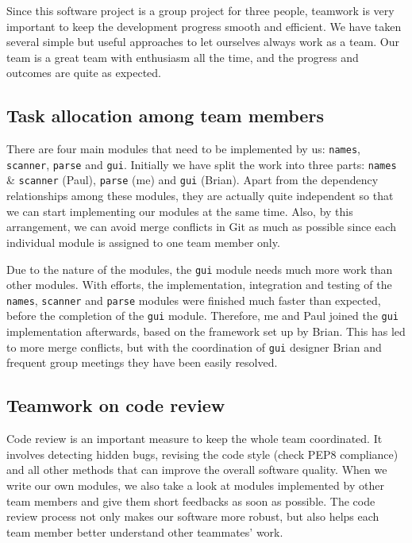 \documentclass[10pt,a4paper]{article}
\begin{document}
Since this software project is a group project for three people,
teamwork is very important to keep the development progress smooth and
efficient. We have taken several simple but useful approaches to let
ourselves always work as a team. Our team is a great team with
enthusiasm all the time, and the progress and outcomes are quite as
expected.

\subsection{Task allocation among team members}
\label{sec:org3615d9e}

There are four main modules that need to be implemented by us:
\texttt{names}, \texttt{scanner}, \texttt{parse} and \texttt{gui}. Initially we have split the
work into three parts: \texttt{names} \& \texttt{scanner} (Paul), \texttt{parse} (me) and
\texttt{gui} (Brian). Apart from the dependency relationships among these
modules, they are actually quite independent so that we can start
implementing our modules at the same time. Also, by this arrangement,
we can avoid merge conflicts in Git as much as possible since each
individual module is assigned to one team member only.

Due to the nature of the modules, the \texttt{gui} module needs much more
work than other modules. With efforts, the implementation, integration
and testing of the \texttt{names}, \texttt{scanner} and \texttt{parse} modules were
finished much faster than expected, before the completion of the \texttt{gui}
module. Therefore, me and Paul joined the \texttt{gui} implementation
afterwards, based on the framework set up by Brian. This has led to
more merge conflicts, but with the coordination of \texttt{gui} designer
Brian and frequent group meetings they have been easily resolved.

\subsection{Teamwork on code review}
\label{sec:orga94e1d1}

Code review is an important measure to keep the whole team
coordinated. It involves detecting hidden bugs, revising the code
style (check PEP8 compliance) and all other methods that can improve
the overall software quality. When we write our own modules, we also
take a look at modules implemented by other team members and give them
short feedbacks as soon as possible. The code review process not only
makes our software more robust, but also helps each team member better
understand other teammates' work.
\end{document}
